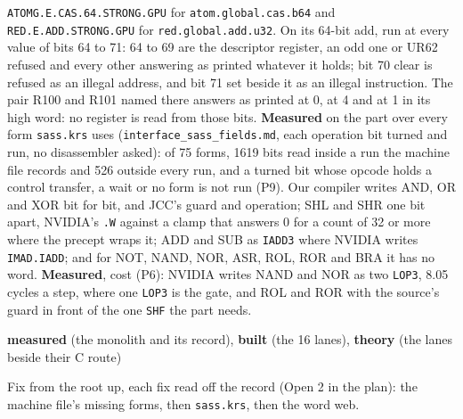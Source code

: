 \begin{description}
\texttt{ATOMG.\allowbreak{}E.\allowbreak{}CAS.\allowbreak{}64.\allowbreak{}STRONG.\allowbreak{}GPU} for \texttt{atom.\allowbreak{}global.\allowbreak{}cas.\allowbreak{}b64} and \texttt{RED.\allowbreak{}E.\allowbreak{}ADD.\allowbreak{}STRONG.\allowbreak{}GPU} for \texttt{red.\allowbreak{}global.\allowbreak{}add.\allowbreak{}u32}. On its 64-bit add, run at every value of bits 64 to 71: 64 to 69 are the descriptor register, an odd one or UR62 refused and every other answering as printed whatever it holds; bit 70 clear is refused as an illegal address, and bit 71 set beside it as an illegal instruction. The pair R100 and R101 named there answers as printed at 0, at 4 and at 1 in its high word: no register is read from those bits. \textbf{Measured} on the part over every form \texttt{sass.\allowbreak{}krs} uses (\texttt{interface\_\allowbreak{}sass\_\allowbreak{}fields.\allowbreak{}md}, each operation bit turned and run, no disassembler asked): of 75 forms, 1619 bits read inside a run the machine file records and 526 outside every run, and a turned bit whose opcode holds a control transfer, a wait or no form is not run (P9). Our compiler writes AND, OR and XOR bit for bit, and JCC's guard and operation; SHL and SHR one bit apart, NVIDIA's \texttt{.\allowbreak{}W} against a clamp that answers 0 for a count of 32 or more where the precept wraps it; ADD and SUB as \texttt{IADD3} where NVIDIA writes \texttt{IMAD.\allowbreak{}IADD}; and for NOT, NAND, NOR, ASR, ROL, ROR and BRA it has no word. \textbf{Measured}, cost (P6): NVIDIA writes NAND and NOR as two \texttt{LOP3}, 8.05 cycles a step, where one \texttt{LOP3} is the gate, and ROL and ROR with the source's guard in front of the one \texttt{SHF} the part needs.
\item[{status}] \textbf{measured} (the monolith and its record), \textbf{built} (the 16 lanes), \textbf{theory} (the lanes beside their C route)
\item[{next}] Fix from the root up, each fix read off the record (Open 2 in the plan): the machine file's missing forms, then \texttt{sass.\allowbreak{}krs}, then the word web.
\end{description}

